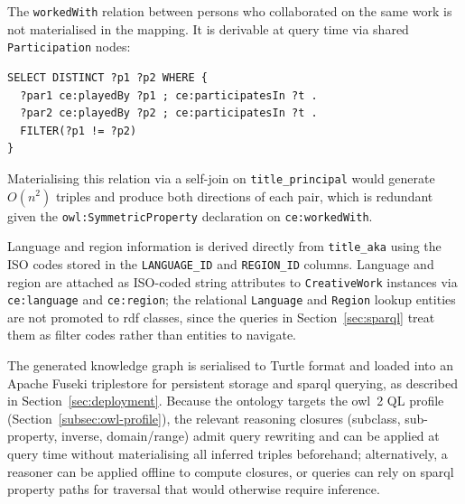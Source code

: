 The \texttt{workedWith} relation between persons who collaborated on the same work is not materialised in the mapping. It is derivable at query time via shared \texttt{Participation} nodes:

\begin{verbatim}
SELECT DISTINCT ?p1 ?p2 WHERE {
  ?par1 ce:playedBy ?p1 ; ce:participatesIn ?t .
  ?par2 ce:playedBy ?p2 ; ce:participatesIn ?t .
  FILTER(?p1 != ?p2)
}
\end{verbatim}

Materialising this relation via a self-join on \texttt{title\_principal} would generate $O(n^2)$ triples and produce both directions of each pair, which is redundant given the \texttt{owl:SymmetricProperty} declaration on \texttt{ce:workedWith}.

Language and region information is derived directly from \texttt{title\_aka} using the ISO codes stored in the \texttt{LANGUAGE\_ID} and \texttt{REGION\_ID} columns. Language and region are attached as ISO-coded string attributes to \texttt{CreativeWork} instances via \texttt{ce:language} and \texttt{ce:region}; the relational \texttt{Language} and \texttt{Region} lookup entities are not promoted to \ac{rdf} classes, since the queries in Section~\ref{sec:sparql} treat them as filter codes rather than entities to navigate.


The generated knowledge graph is serialised to Turtle format and loaded into an Apache Fuseki triplestore for persistent storage and \ac{sparql} querying, as described in Section~\ref{sec:deployment}. Because the ontology targets the \ac{owl}~2 QL profile (Section~\ref{subsec:owl-profile}), the relevant reasoning closures (subclass, sub-property, inverse, domain/range) admit query rewriting and can be applied at query time without materialising all inferred triples beforehand; alternatively, a reasoner can be applied offline to compute closures, or queries can rely on \ac{sparql} property paths for traversal that would otherwise require inference.



